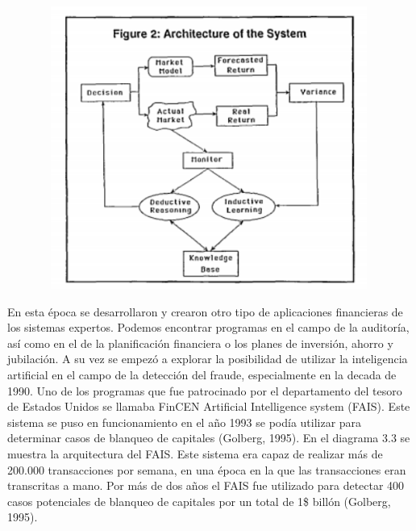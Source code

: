 \documentclass[]{DissertateUSU}
\begin{document}
\includegraphics[width=5.20833in,height=3.64583in]{protrader.png}
\centering
{}

\setlength\parskip{5ex}
\justifying

\noindent En esta época se desarrollaron y crearon otro tipo de
aplicaciones financieras de los sistemas expertos. Podemos encontrar
programas en el campo de la auditoría, así como en el de la
planificación financiera o los planes de inversión, ahorro y jubilación.
A su vez se empezó a explorar la posibilidad de utilizar la inteligencia
artificial en el campo de la detección del fraude, especialmente en la
decada de 1990. Uno de los programas que fue patrocinado por el
departamento del tesoro de Estados Unidos se llamaba FinCEN Artificial
Intelligence system (FAIS). Este sistema se puso en funcionamiento en el
año 1993 se podía utilizar para determinar casos de blanqueo de
capitales (Golberg, 1995). En el diagrama 3.3 se muestra la arquitectura
del FAIS. Este sistema era capaz de realizar más de 200.000
transacciones por semana, en una época en la que las transacciones eran
transcritas a mano. Por más de dos años el FAIS fue utilizado para
detectar 400 casos potenciales de blanqueo de capitales por un total de
1\$ billón (Golberg, 1995).

\centering
\end{document}
